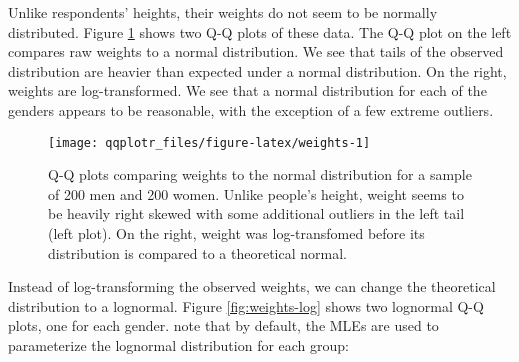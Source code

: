 Unlike respondents' heights, their weights do not seem to be normally
distributed. Figure \ref{fig:weights} shows two Q-Q plots of these data.
The Q-Q plot on the left compares raw weights to a normal distribution.
We see that tails of the observed distribution are heavier than expected
under a normal distribution. On the right, weights are log-transformed.
We see that a normal distribution for each of the genders appears to be
reasonable, with the exception of a few extreme outliers.

\begin{Schunk}
\begin{figure}

{\centering \texttt{[image: qqplotr\_files/figure-latex/weights-1]} 

}

\caption[Q-Q plots comparing weights to the normal distribution for a sample of 200 men and 200 women]{Q-Q plots comparing weights to the normal distribution for a sample of 200 men and 200 women. Unlike people's height, weight seems to be heavily right skewed with some additional outliers in the left tail (left plot). On the right, weight was log-transfomed before its distribution is compared to a theoretical normal.}\label{fig:weights}
\end{figure}
\end{Schunk}

Instead of log-transforming the observed weights, we can change the
theoretical distribution to a lognormal. Figure \ref{fig:weights-log}
shows two lognormal Q-Q plots, one for each gender. note that by
default, the MLEs are used to parameterize the lognormal distribution
for each group:

